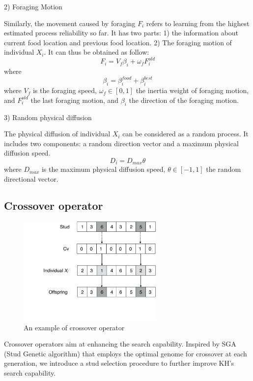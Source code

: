 \documentclass[journal]{IEEEtran}
\begin{document}
2) Foraging Motion

Similarly, the movement caused by foraging $F_i$ refers to learning from the highest estimated process reliability so far. 
It has two parts: 1) the information about current food location and previous food location. 
2) The foraging motion of individual $X_i$.
It can thus be obtained as follow:
\begin{equation}
F_i = V_f\beta_i + \omega_f F^{old}_i
\end{equation}
where
\begin{equation}
\beta_i = \beta_i^{food}+\beta_i^{best}
\end{equation}
where $V_f$ is the foraging speed, $\omega_f \in [0, 1]$ the inertia weight of foraging motion, and $F^{old}_i$ the last foraging motion, and $\beta_i$ the direction of the foraging motion.

3) Random physical diffusion

The physical diffusion of individual $X_i$ can be considered as a random process. It includes two components: a random direction vector and a maximum physical diffusion speed.
\begin{equation}
D_i = D_{max}\theta
\end{equation}
where $D_{max}$ is the maximum physical diffusion speed, $\theta \in [-1, 1]$ the random directional vector.

\subsection{Crossover operator}

\begin{figure}[!t]
\centering
\includegraphics[width=2.8in]{./img/pic7.pdf}
\caption{An example of crossover operator}
\label{Crossover operator}
\end{figure}

Crossover operators aim at enhancing the search capability. Inspired by SGA (Stud Genetic algorithm) \cite{wang2014stud} that employs the optimal genome for crossover at each generation, we introduce a stud selection procedure to further improve KH's search capability.
\end{document}
